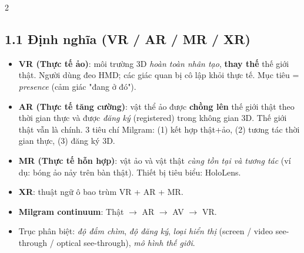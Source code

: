 \begin{paracol}{2}
\subsection*{1.1 Định nghĩa (VR / AR / MR / XR)}
\begin{itemize}[leftmargin=*,nosep]
  \item \textbf{VR (Thực tế ảo)}: môi trường 3D \emph{hoàn toàn nhân tạo}, \textbf{thay thế} thế giới thật. Người dùng đeo HMD; các giác quan bị cô lập khỏi thực tế. Mục tiêu = \emph{presence} (cảm giác "đang ở đó").
  \item \textbf{AR (Thực tế tăng cường)}: vật thể ảo được \textbf{chồng lên} thế giới thật theo thời gian thực và được \emph{đăng ký} (registered) trong không gian 3D. Thế giới thật vẫn là chính. 3 tiêu chí Milgram: (1) kết hợp thật+ảo, (2) tương tác thời gian thực, (3) đăng ký 3D.
  \item \textbf{MR (Thực tế hỗn hợp)}: vật ảo và vật thật \emph{cùng tồn tại và tương tác} (ví dụ: bóng ảo nảy trên bàn thật). Thiết bị tiêu biểu: HoloLens.
  \item \textbf{XR}: thuật ngữ ô bao trùm VR + AR + MR.
  \item \textbf{Milgram continuum}: Thật $\to$ AR $\to$ AV $\to$ VR.
  \item Trục phân biệt: \emph{độ đắm chìm}, \emph{độ đăng ký}, \emph{loại hiển thị} (screen / video see-through / optical see-through), \emph{mô hình thế giới}.
\end{itemize}

\switchcolumn*


\end{paracol}
